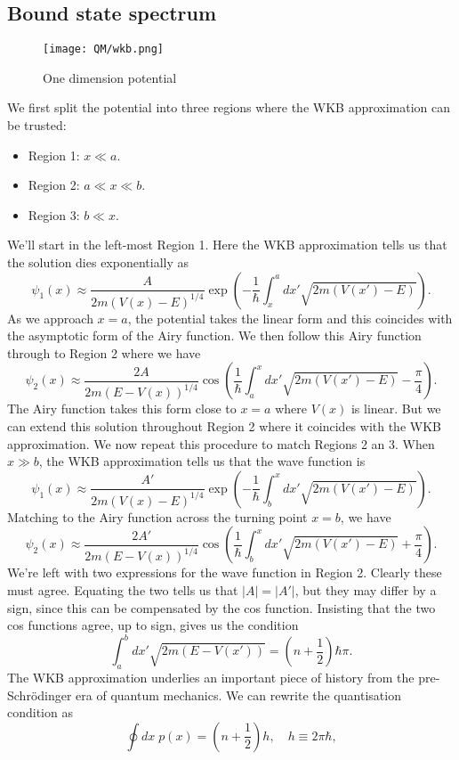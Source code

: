 \subsection{Bound state spectrum}
\begin{figure}[!h]
	\centering
	\texttt{[image: QM/wkb.png]}
	\caption{One dimension potential}
\end{figure}
\noindent
We first split the potential into three regions where the WKB approximation can be trusted:
\begin{itemize}
\item Region 1: $x \ll a$.
\item Region 2: $a \ll x \ll b$.
\item Region 3: $b \ll x$.
\end{itemize}
We'll start in the left-most Region 1. Here the WKB
approximation tells us that the solution dies exponentially as
\[\psi_1(x) \approx \frac{A}{2m(V(x) - E)^{1/4}} \exp \left( -\frac{1}{\hbar} \int_{x}^a dx' \sqrt{2m(V(x')-E)} \right).\]
As we approach $x = a$, the potential takes the linear form and this coincides with the asymptotic form of the Airy function. We then follow this Airy function through to Region 2 where we have
\[\psi_2(x) \approx \frac{2A}{2m(E - V(x))^{1/4}} \cos \left( \frac{1}{\hbar} \int_{a}^x dx' \sqrt{2m(V(x')-E)} - \frac{\pi}{4} \right).\]
The Airy function takes this form close to $x = a$ where $V(x)$ is linear. But we can extend this solution throughout Region 2 where it coincides with the WKB approximation.
We now repeat this procedure to match Regions 2 an 3. When $x \gg b$, the WKB approximation tells us that the wave function is
\[\psi_1(x) \approx \frac{A'}{2m(V(x) - E)^{1/4}} \exp \left( -\frac{1}{\hbar} \int_{b}^x dx' \sqrt{2m(V(x')-E)} \right).\]
Matching to the Airy function across the turning point $x = b$, we have
\[\psi_2(x) \approx \frac{2A'}{2m(E - V(x))^{1/4}} \cos \left( \frac{1}{\hbar} \int_{b}^x dx' \sqrt{2m(V(x')-E)} + \frac{\pi}{4} \right).\]
We're left with two expressions for the wave function in Region 2.
Clearly these must agree. Equating the two tells us that $|A| = |A'|$, but they may differ by a sign, since this can be compensated by the cos function. Insisting that the two cos functions agree, up to sign, gives us the condition
\[\int_a^b dx' \sqrt{2m(E-V(x'))} = \left( n + \frac{1}{2} \right) \hbar \pi.\]
The WKB approximation underlies an important piece of history from the pre-Schr\"{o}dinger era of quantum mechanics. 
We can rewrite the quantisation condition as
\[\oint dx \; p(x) = \left( n + \frac{1}{2} \right) h , \quad h \equiv 2\pi \hbar ,\]
